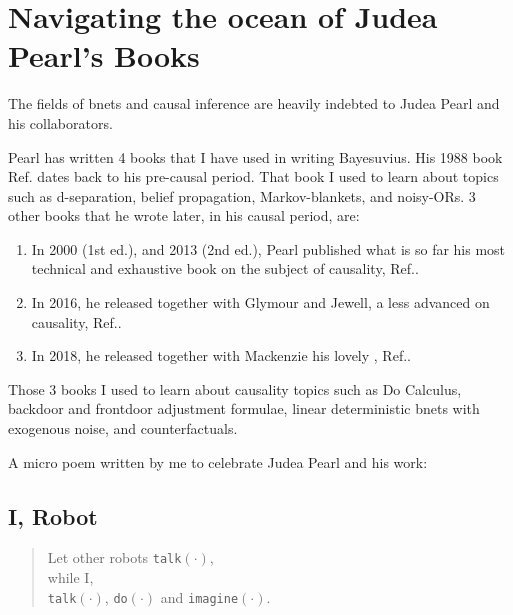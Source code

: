 \chapter{Navigating 
the ocean of Judea Pearl's Books}

\label{ch-nav-pearl}

The fields of bnets and causal inference are
heavily indebted to Judea Pearl and his
collaborators.

Pearl has written
4 books that I have used
in writing Bayesuvius.
His 
1988 book Ref.\cite{pearl-1988book}
dates back to his pre-causal period.
That book I used to learn
about topics such as
d-separation, belief propagation,
Markov-blankets, and noisy-ORs.
3 other books that  he  wrote later,
in his causal period, 
are:
\begin{enumerate}
\item
In 2000 (1st ed.), and 2013 (2nd ed.),
Pearl published what
is so far
his most technical
and exhaustive book
on the subject of causality,
Ref.\cite{pearl-2013book}.
\item
In 2016,
he released 
together
with Glymour and Jewell,
a less advanced 
on causality, Ref.\cite{pearl-primer}.
\item
In 2018, 
he released 
together with
Mackenzie his
lovely  ,
 Ref.\cite{book-why}.
\end{enumerate}
Those 3 books I used to learn
about causality topics
such as Do Calculus,
backdoor and frontdoor
adjustment formulae,
linear 
deterministic 
bnets with exogenous noise,
and counterfactuals.

A micro poem written by me
to celebrate Judea Pearl and 
his work:
 
\section*{I, Robot}
\begin{verse}
Let other robots {\tt talk$(\cdot)$},\\
while I,\\
{\tt talk$(\cdot)$}, {\tt do$(\cdot)$} and {\tt imagine$(\cdot)$}.
\end{verse}
